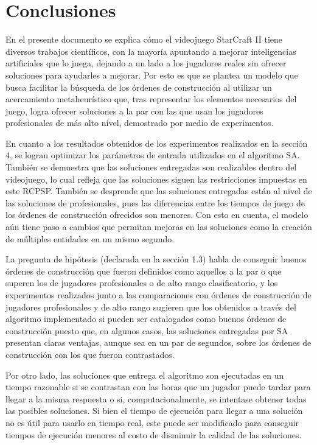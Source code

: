\chapter{Conclusiones}
\label{cap:conclusiones}

En el presente documento se explica cómo el videojuego StarCraft II tiene diversos trabajos científicos, con la mayoría apuntando a mejorar inteligencias artificiales que lo juega, dejando a un lado a los jugadores reales sin ofrecer soluciones para ayudarles a mejorar. Por esto es que se plantea un modelo que busca facilitar la búsqueda de los órdenes de construcción al utilizar un acercamiento metaheurístico que, tras representar los elementos necesarios del juego, logra ofrecer soluciones a la par con las que usan los jugadores profesionales de más alto nivel, demostrado por medio de experimentos.

En cuanto a los resultados obtenidos de los experimentos realizados en la sección 4, se logran optimizar los parámetros de entrada utilizados en el algoritmo SA. También se demuestra que las soluciones entregadas son realizables dentro del videojuego, lo cual refleja que las soluciones siguen las restricciones impuestas en este RCPSP. También se desprende que las soluciones entregadas están al nivel de las soluciones de profesionales, pues las diferencias entre los tiempos de juego de los órdenes de construcción ofrecidos son menores. Con esto en cuenta, el modelo aún tiene paso a cambios que permitan mejoras en las soluciones como la creación de múltiples entidades en un mismo segundo.

La pregunta de hipótesis (declarada en la sección 1.3) habla de conseguir buenos órdenes de construcción que fueron definidos como aquellos a la par o que superen los de jugadores profesionales o de alto rango clasificatorio, y los experimentos realizados junto a las comparaciones con órdenes de construcción de jugadores profesionales y de alto rango sugieren que los obtenidos a través del algoritmo implementado si pueden ser catalogados como buenos órdenes de construcción puesto que, en algunos casos, las soluciones entregadas por SA presentan claras ventajas, aunque sea en un par de segundos, sobre los órdenes de construcción con los que fueron contrastados.

Por otro lado, las soluciones que entrega el algoritmo son ejecutadas en un tiempo razonable si se contrastan con las horas que un jugador puede tardar para llegar a la misma respuesta o si, computacionalmente, se intentase obtener todas las posibles soluciones. Si bien el tiempo de ejecución para llegar a una solución no es útil para usarlo en tiempo real, este puede ser modificado para conseguir tiempos de ejecución menores al costo de disminuir la calidad de las soluciones.

